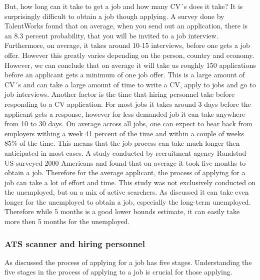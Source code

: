 But, how long can it take to get a job and how many CV´s does it take?
It is surprisingly difficult to obtain a job though applying.
A survey done by TalentWorks found that on average, when you send out an application, there is an 8.3 percent probability, that you will be invited to a job interview. 
Furthermore, on average, it takes around 10-15 interviews, before one gets a job offer. 
However this greatly varies depending on the person, country and economy.
However, we can conclude that on average it will take us roughly 150 applications before an applicant gets a minimum of one job offer.\cite{HR-sales}
This is a large amount of CV´s and can take a large amount of time to write a CV, apply to jobs and go to job interviews.
Another factor is the time that hiring personnel take before responding to a CV application.
For most jobs it takes around 3 days before the applicant gets a response, however for less demanded job it can take anywhere from 10 to 30 days.\cite{HR-sales}
On average across all jobs, one can expect to hear back from employers withing a week 41 percent of the time and within a couple of weeks 85\% of the time.
This means that the job process can take much longer then anticipated in most cases.
A study conducted by recruitment agency Randstad US surveyed 2000 Americans and found that on average it took five months to obtain a job.\cite{5_month_for_a_job}
Therefore for the average applicant, the process of applying for a job can take a lot of effort and time.
This study was not exclusively conducted on the unemployed, but on a mix of active searchers.
As discussed it can take even longer for the unemployed to obtain a job, especially the long-term unemployed.
Therefore while 5 months is a good lower bounds estimate, it can easily take more then 5 months for the unemployed. \\

\subsubsection{ATS scanner and hiring personnel}
As discussed the process of applying for a job has five stages.
Understanding the five stages in the process of applying to a job is crucial for those applying.

